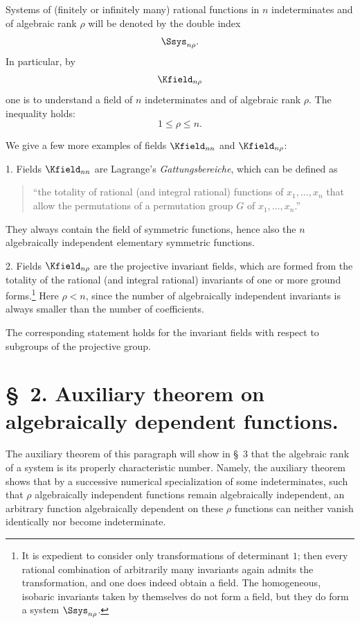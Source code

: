 \documentclass[11pt]{article}
\begin{document}
Systems of (finitely or infinitely many) rational functions in $n$ indeterminates and of algebraic rank $\rho$ will be denoted by the double index
\[
  \Ssys_{n\rho}.
\]
In particular, by
\[
  \Kfield_{n\rho}
\]
one is to understand a field of $n$ indeterminates and of algebraic rank $\rho$. The inequality holds:
\[
  1\leq \rho\leq n.
\]

We give a few more examples of fields $\Kfield_{nn}$ and $\Kfield_{n\rho}$:

1. Fields $\Kfield_{nn}$ are Lagrange's \emph{Gattungsbereiche}, which can be defined as
\begin{quote}
``the totality of rational (and integral rational) functions of $x_1,\ldots,x_n$ that allow the permutations of a permutation group $G$ of $x_1,\ldots,x_n$.''
\end{quote}
They always contain the field of symmetric functions, hence also the $n$ algebraically independent elementary symmetric functions.

2. Fields $\Kfield_{n\rho}$ are the projective invariant fields, which are formed from the totality of the rational (and integral rational) invariants of one or more ground forms.\footnote{It is expedient to consider only transformations of determinant $1$; then every rational combination of arbitrarily many invariants again admits the transformation, and one does indeed obtain a field. The homogeneous, isobaric invariants taken by themselves do not form a field, but they do form a system $\Ssys_{n\rho}$.} Here $\rho<n$, since the number of algebraically independent invariants is always smaller than the number of coefficients.

The corresponding statement holds for the invariant fields with respect to subgroups of the projective group.

\section*{\S\ 2. Auxiliary theorem on algebraically dependent functions.}

The auxiliary theorem of this paragraph will show in \S\ 3 that the algebraic rank of a system is its properly characteristic number. Namely, the auxiliary theorem shows that by a successive numerical specialization of some indeterminates, such that $\rho$ algebraically independent functions remain algebraically independent, an arbitrary function algebraically dependent on these $\rho$ functions can neither vanish identically nor become indeterminate.
\end{document}
